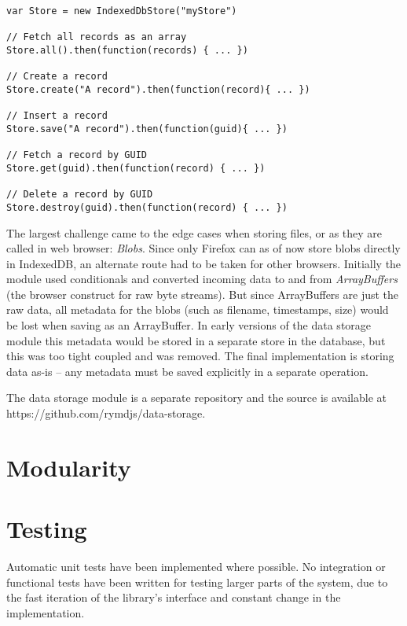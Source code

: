 \begin{Code}
\begin{lstlisting}[caption=Common database operations]
var Store = new IndexedDbStore("myStore")

// Fetch all records as an array
Store.all().then(function(records) { ... })

// Create a record
Store.create("A record").then(function(record){ ... })

// Insert a record
Store.save("A record").then(function(guid){ ... })

// Fetch a record by GUID
Store.get(guid).then(function(record) { ... })

// Delete a record by GUID
Store.destroy(guid).then(function(record) { ... })
\end{lstlisting}
\end{Code}

The largest challenge came to the edge cases when storing files, or as they are called in web browser: \emph{Blobs}. Since only Firefox can as of now store blobs directly in IndexedDB, an alternate route had to be taken for other browsers. Initially the module used conditionals and converted incoming data to and from \emph{ArrayBuffers} (the browser construct for raw byte streams). But since ArrayBuffers are just the raw data, all metadata for the blobs (such as filename, timestamps, size) would be lost when saving as an ArrayBuffer. In early versions of the data storage module this metadata would be stored in a separate store in the database, but this was too tight coupled and was removed. The final implementation is storing data as-is – any metadata must be saved explicitly in a separate operation.

The data storage module is a separate repository and the source is available at https://github.com/rymdjs/data-storage.

\section{Modularity}


\section{Testing}
\label{sec:testing}
Automatic unit tests have been implemented where possible. No integration or functional tests have been written for testing larger parts of the system, due to the fast iteration of the library's interface and constant change in the implementation. 
